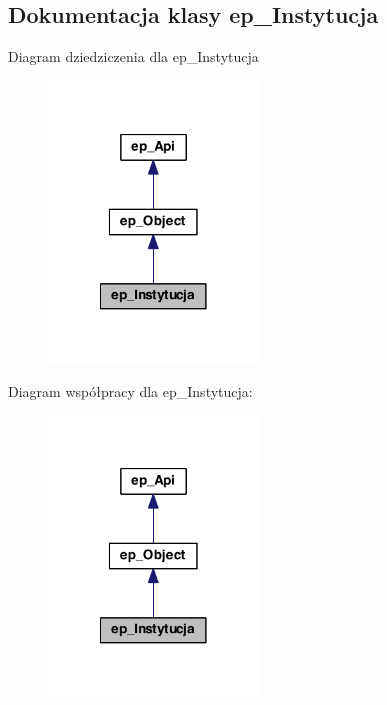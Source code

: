 \hypertarget{classep___instytucja}{\subsection{Dokumentacja klasy ep\-\_\-\-Instytucja}
\label{classep___instytucja}
}


Diagram dziedziczenia dla ep\-\_\-\-Instytucja\nopagebreak
\begin{figure}[H]
\begin{center}
\leavevmode
\includegraphics[width=158pt]{classep___instytucja__inherit__graph}
\end{center}
\end{figure}


Diagram współpracy dla ep\-\_\-\-Instytucja\-:\nopagebreak
\begin{figure}[H]
\begin{center}
\leavevmode
\includegraphics[width=158pt]{classep___instytucja__coll__graph}
\end{center}
\end{figure}
